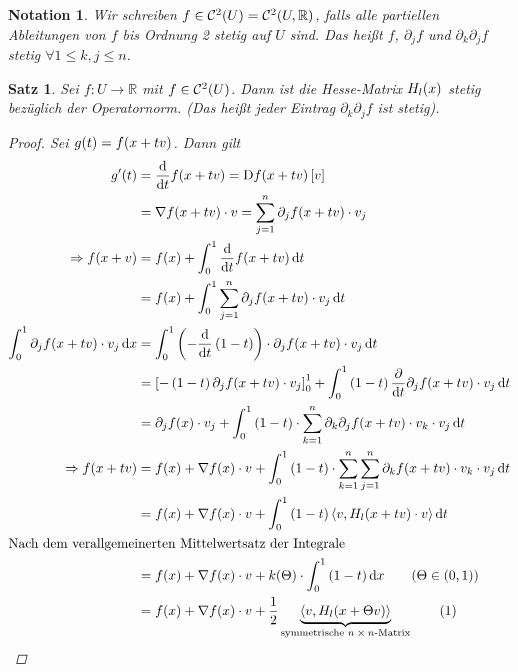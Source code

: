 \documentclass[11pt, twoside, a4paper]{article}
\theoremstyle{plain}
\newtheorem{satz}[blockelement]{Satz}
\newtheorem{notation}[blockelement]{Notation}
\numberwithin{equation}{subsection}
\newcommand{\numberthis}[0]{\addtocounter{equation}{1}\tag{\theequation}}
\newcommand{\pair}[1]{\left(#1\right)}
\newcommand{\of}[1]{\mathopen{}\mathclose{}\bgroup\left(#1\aftergroup\egroup\right)}
\newcommand{\interv}[1]{\left[#1\right]}
\newcommand{\sprod}[1]{\left<#1\right>}
\newcommand{\impl}[0]{\Rightarrow{}}
\newcommand{\fromto}{\rightarrow{}}
\newcommand{\dif}{\mathop{}\!\mathrm{d}}
\DeclareMathOperator{\D}{D\!}
\newcommand{\R}{\mathbb{R}}
\newcommand{\mC}{\mathcal{C}}
\begin{document}
    \begin{notation}
        Wir schreiben $f\in\mC^2\of{U} = \mC^2 \of{U, \R}$, falls alle partiellen Ableitungen von $f$ bis Ordnung 2 stetig auf $U$ sind. Das heißt $f$, $\partial_j f$ und $\partial_k \partial_j f$ stetig $\forall 1\leq k,j\leq n$.
    \end{notation}

    \begin{satz}
        Sei $f: U\fromto\R$ mit $f\in\mC^2\of{U}$. Dann ist die Hesse-Matrix $H_l \of{x}$ stetig bezüglich der Operatornorm. (Das heißt jeder Eintrag $\partial_k\partial_j f$ ist stetig).

        \begin{proof}
            Sei $g\of{t} = f\of{x+tv}$. Dann gilt
            \begin{align*}
                g'\of{t} &= \frac{\dif}{\dif t} f\of{x+tv} = \D f\of{x+tv}\interv{v}\\
                &= \nabla f\of{x+tv}\cdot v = \sum_{j=1}^{n} \partial_j f\of{x+tv}\cdot v_j\\
                \impl f\of{x+v} &= f\of{x} + \int_{0}^{1} \frac{\dif}{\dif t}f\of{x+tv} \dif t\\
                &= f\of{x} + \int_{0}^{1} \sum_{j=1}^{n} \partial_j f\of{x+tv}\cdot v_j \dif t\\
                \int_{0}^{1} \partial_j f\of{x+tv}\cdot v_j \dif x &= \int_{0}^{1} \pair{-\frac{\dif}{\dif t}\pair{1-t}}\cdot \partial_j f\of{x+tv}\cdot v_j \dif t\\
                &= \interv{-\pair{1-t}\partial_j f\of{x+tv}\cdot v_j}_{0}^1 + \int_{0}^{1} \pair{1-t}\frac{\partial}{\dif t} \partial_j f\of{x+tv}\cdot v_j\dif t\\
                &= \partial_j f\of{x}\cdot v_j + \int_{0}^{1} \pair{1-t}\cdot \sum_{k=1}^{n} \partial_k\partial_j f\of{x+tv}\cdot v_k\cdot v_j \dif t\\
                \impl f\of{x+tv} &= f\of{x} + \nabla f\of{x}\cdot v + \int_{0}^{1} \pair{1-t}\cdot \sum_{k=1}^{n} \sum_{j=1}^{n} \partial_k f\of{x+tv}\cdot v_k\cdot v_j \dif t\\
                &= f\of{x} + \nabla f\of{x}\cdot v +\int_{0}^{1} \pair{1-t}\sprod{v, H_l \of{x+tv}\cdot v} \dif t\\
                \intertext{Nach dem verallgemeinerten Mittelwertsatz der Integrale}
                &= f\of{x} + \nabla f\of{x}\cdot v + k\of{\Theta}\cdot \int_{0}^{1} \pair{1-t} \dif x\tag{$\Theta\in\pair{0,1}$}\\
                &= f\of{x} + \nabla f\of{x}\cdot v + \frac{1}{2}\underbrace{\sprod{v, H_l\of{x+\Theta v}}}_{\text{symmetrische $n\times n$-Matrix}}\numberthis\label{eq:extrema-lokal}
            \end{align*}
        \end{proof}
    \end{satz}
\end{document}
